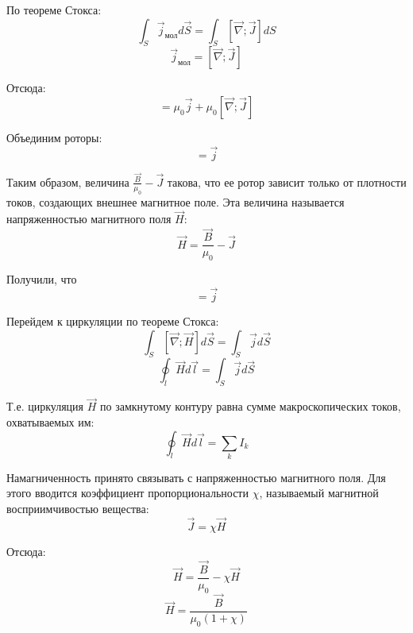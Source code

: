 \documentclass{article}
\begin{document}
	По теореме Стокса:
	\begin{equation}
		\int_S \vec j_\text{мол}d\vec S = \int_S [\vec\nabla;\vec J]dS
	\end{equation}
	\begin{equation}
		\vec j_\text{мол} = [\vec\nabla;\vec J]
	\end{equation}

	Отсюда:
	\begin{equation}
		[\vec\nabla;\vec B] = \mu_0\vec j + \mu_0[\vec\nabla;\vec J]
	\end{equation}

	Объединим роторы:
	\begin{equation}
		[\vec\nabla;\frac{\vec B}{\mu_0} - \vec J] = \vec j
	\end{equation}

	Таким образом, величина $\frac{\vec B}{\mu_0} - \vec J$ такова, что ее ротор зависит только от плотности токов, создающих внешнее магнитное поле. Эта величина называется напряженностью магнитного поля $\vec H$:
	\begin{equation}
		\vec H = \frac{\vec B}{\mu_0} - \vec J
	\end{equation}

	Получили, что
	\begin{equation}
		[\vec\nabla;\vec H] = \vec j
	\end{equation}

	Перейдем к циркуляции по теореме Стокса:
	\begin{equation}
		\int_S [\vec\nabla;\vec H] d\vec S = \int_S \vec j d\vec S
	\end{equation}
	\begin{equation}
		\oint_l \vec H d\vec l = \int_S \vec j d\vec S
	\end{equation}

	Т.е. циркуляция $\vec H$ по замкнутому контуру равна сумме макроскопических токов, охватываемых им:
	\begin{equation}
		\oint_l \vec H d\vec l = \sum_k I_k
	\end{equation}

	Намагниченность принято связывать с напряженностью магнитного поля. Для этого вводится коэффициент пропорциональности $\chi$, называемый магнитной восприимчивостью вещества:
	\begin{equation}
		\vec J = \chi\vec H
	\end{equation} 

	Отсюда:
	\begin{equation}
		\vec H = \frac{\vec B}{\mu_0} - \chi\vec H
	\end{equation}
	\begin{equation}
		\vec H = \frac{\vec B}{\mu_0(1+\chi)}
	\end{equation}
\end{document}

